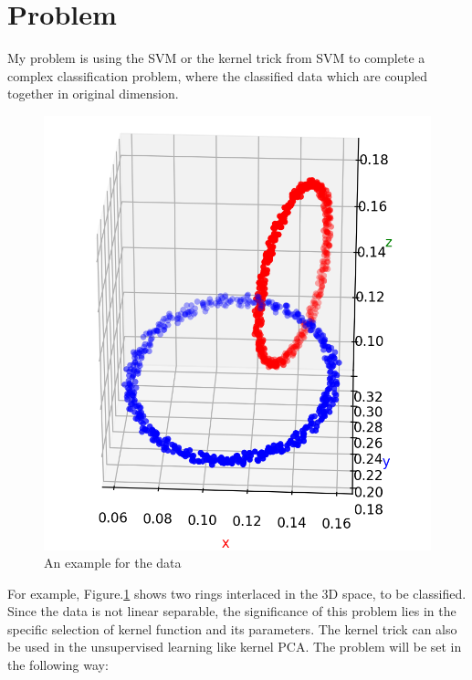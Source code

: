 \documentclass{article}
\begin{document}
\section{Problem}
My problem is using the SVM or the kernel trick from SVM to complete a complex classification problem, where the classified data which are coupled together in original dimension. 
\begin{figure}[H]
    \centering
    \includegraphics[scale=0.25]{p5.png}
    \caption{An example for the data}
    \label{ring}
\end{figure}
For example, Figure.\ref{ring} shows two rings interlaced in the 3D space, to be classified. Since the data is not linear separable, the significance of this problem lies in the specific selection of kernel function and its parameters. The kernel trick can also be used in the unsupervised learning like kernel PCA. The problem will be set in the following way:
\end{document}
